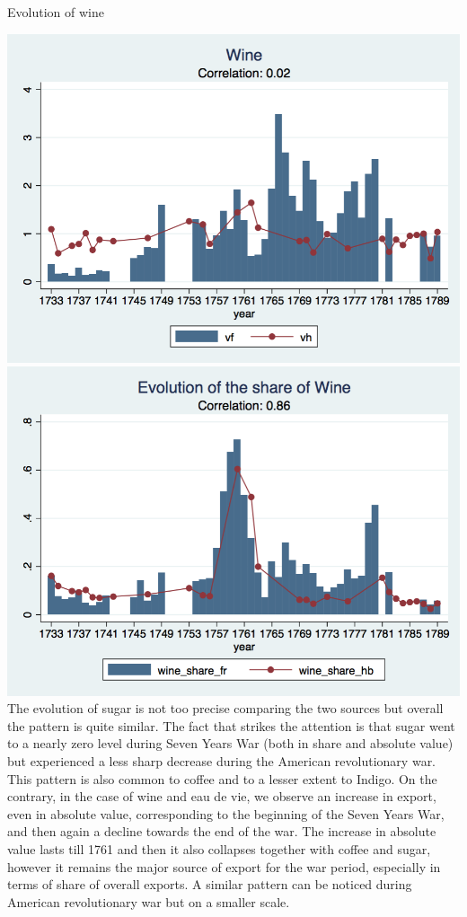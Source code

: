 \documentclass[12pt,a4paper,titlepage]{article}
\begin{document}
\caption{Evolution of wine}
\includegraphics[scale=.28]{wine_long.png}
\includegraphics[scale=.28]{wine_share_long.png}
The evolution of sugar is not too precise comparing the two sources but overall the pattern is quite similar. The fact that strikes the attention is that sugar went to a nearly zero level during Seven Years War (both in share and absolute value) but experienced a less sharp decrease during the American revolutionary war. This pattern is also common to coffee and to a lesser extent to Indigo. On the contrary, in the case of wine and eau de vie, we observe an increase in export, even in absolute value, corresponding to the beginning of the Seven Years War, and then again a decline towards the end of the war. The increase in absolute value lasts till 1761 and then it also collapses together with coffee and sugar, however it remains the major source of export for the war period, especially in terms of share of overall exports. A similar pattern can be noticed during American revolutionary war but on a smaller scale. 
\end{document}
